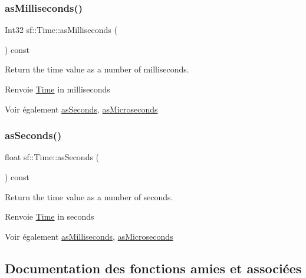 \subsubsection{\texorpdfstring{as\+Milliseconds()}{asMilliseconds()}}
{\footnotesize\ttfamily Int32 sf\+::\+Time\+::as\+Milliseconds (\begin{DoxyParamCaption}{ }\end{DoxyParamCaption}) const}



Return the time value as a number of milliseconds. 

\begin{DoxyReturn}{Renvoie}
\hyperlink{classsf_1_1Time}{Time} in milliseconds
\end{DoxyReturn}
\begin{DoxySeeAlso}{Voir également}
\hyperlink{classsf_1_1Time_aa3df2f992d0b0041b4eb02258d43f0e3}{as\+Seconds}, \hyperlink{classsf_1_1Time_a000c2c64b74658ebd228b9294a464275}{as\+Microseconds} 
\end{DoxySeeAlso}
\mbox{\label{classsf_1_1Time_aa3df2f992d0b0041b4eb02258d43f0e3}} 
\subsubsection{\texorpdfstring{as\+Seconds()}{asSeconds()}}
{\footnotesize\ttfamily float sf\+::\+Time\+::as\+Seconds (\begin{DoxyParamCaption}{ }\end{DoxyParamCaption}) const}



Return the time value as a number of seconds. 

\begin{DoxyReturn}{Renvoie}
\hyperlink{classsf_1_1Time}{Time} in seconds
\end{DoxyReturn}
\begin{DoxySeeAlso}{Voir également}
\hyperlink{classsf_1_1Time_aa16858ca030a07eb18958c321f256e5a}{as\+Milliseconds}, \hyperlink{classsf_1_1Time_a000c2c64b74658ebd228b9294a464275}{as\+Microseconds} 
\end{DoxySeeAlso}


\subsection{Documentation des fonctions amies et associées}
\mbox{\label{classsf_1_1Time_a951fd7219641f1e8191887f5dfe0dc31}} 
